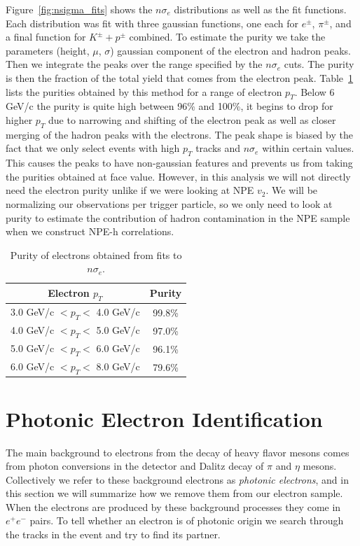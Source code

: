 Figure~\ref{fig:nsigma_fits} shows the $n\sigma_e$ distributions as well as the fit functions. Each distribution was fit with three gaussian functions, one each for $e^{\pm}$, $\pi^{\pm}$, and a final function for $K^{\pm} + p^{\pm}$ combined. To estimate the purity we take the parameters (height, $\mu$, $\sigma$) gaussian component of the electron and hadron peaks. Then we integrate the peaks over the range specified by the $n\sigma_e$ cuts. The purity is then the fraction of the total yield that comes from the electron peak. Table~\ref{tab:purity} lists the purities obtained by this method for a range of electron $p_T$. Below 6 GeV/c the purity is quite high between 96\% and 100\%, it begins to drop for higher $p_T$ due to narrowing and shifting of the electron peak as well as closer merging of the hadron peaks with the electrons. The peak shape is biased by the fact that we only select events with high $p_T$ tracks and $n\sigma_e$ within certain values. This causes the peaks to have non-gaussian features and prevents us from taking the purities obtained at face value. However, in this analysis we will not directly need the electron purity unlike if we were looking at NPE $v_2$. We will be normalizing our observations per trigger particle, so we only need to look at purity to estimate the contribution of hadron contamination in the NPE sample when we construct NPE-h correlations.  

\begin{table}
\centering
\begin{tabular}{|c|c|}
\hline
Electron $p_T$         & Purity \\
\hline
3.0 GeV/c $< p_T <$ 4.0 GeV/c   & 99.8\% \\
\hline
4.0 GeV/c $< p_T <$ 5.0 GeV/c   & 97.0\% \\
\hline
5.0 GeV/c $< p_T <$ 6.0 GeV/c   & 96.1\% \\
\hline
6.0 GeV/c $< p_T <$ 8.0 GeV/c   & 79.6\% \\
\hline
\end{tabular}
\caption[Electron Purity]{Purity of electrons obtained from fits to $n\sigma_e$.}
\label{tab:purity}
\end{table}

\section{Photonic Electron Identification}

The main background to electrons from the decay of heavy flavor mesons comes from photon conversions in the detector and Dalitz decay of $\pi$ and $\eta$ mesons. Collectively we refer to these background electrons as \textit{photonic electrons}, and in this section we will summarize how we remove them from our electron sample. When the electrons are produced by these background processes they come in $e^{+}e^{-}$ pairs. To tell whether an electron is of photonic origin we search through the tracks in the event and try to find its partner.

